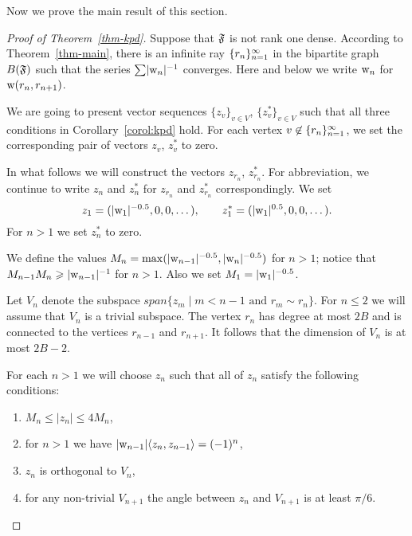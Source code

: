 \documentclass[12pt,oneside,a4paper]{amsart}
\begin{document}
      Now we prove the main result of this section.
      \begin{proof}[Proof of Theorem~\ref{thm-kpd}]
        Suppose that $\mathfrak{F}$ is not rank one dense.
        According to Theorem~\ref{thm-main}, there is an infinite ray $\{{r}_n\}_{n=1}^\infty$ in the bipartite
          graph $B(\mathfrak{F})$ such that the series $\sum\lvert\mathrm{w}_n\rvert^{-1}$ converges.
        Here and below we write $\mathrm{w}_n$ for $\mathrm{w}(r_n, r_{n + 1})$.

        We are going to present vector sequences $\{z_v\}_{v \in V}$, $\{z^*_v\}_{v \in V}$ such that all three conditions in Corollary~\ref{corol:kpd} hold.
        For each vertex $v \not \in \{{r}_n\}_{n=1}^\infty$,
          we set the corresponding pair of vectors $z_v$, $z^*_v$ to zero.

        In what follows we will construct the vectors $z_{r_n}$, $z_{r_n}^*$.
        For abbreviation, we continue to write $z_n$ and $z_n^*$ for $z_{r_n}$ and $z_{r_n}^*$ correspondingly.
        We set
        \[
          z_1=(\lvert\mathrm{w}_1\rvert^{-0.5}, 0, 0, \dots), \qquad z^*_1 = (\lvert\mathrm{w}_1\rvert^{0.5}, 0, 0, \dots).
        \]
        For $n > 1$ we set $z^*_n$ to zero.

        We define the values $M_n = \max(\lvert\mathrm{w}_{n-1}\rvert^{-0.5}, \lvert\mathrm{w}_n\rvert^{-0.5})$
          for $n > 1$; notice that $M_{n - 1} M_n \geqslant \lvert\mathrm{w}_{n - 1}\rvert^{-1}$ for $n > 1$.
        Also we set $M_1 = \lvert\mathrm{w}_1\rvert^{-0.5}$.

        Let $V_n$ denote the subspace $span\{z_m \mid m < n - 1 \text{ and } r_m \sim r_n\}$.
        For $n \leq 2$ we will assume that $V_n$ is a trivial subspace.
        The vertex $r_n$ has degree at most $2B$ and is connected to the vertices $r_{n-1}$ and $r_{n+1}$.
        It follows that the dimension of $V_n$ is at most $2B - 2$.

        For each $n > 1$ we will choose $z_n$ such that all of $z_n$ satisfy the following conditions:
        \begin{enumerate}[label=\textup{(\alph*)}]
          \item \label{kpd:c1} $M_n \leq \lvert z_n \rvert \leq 4 M_n$,
          \item \label{kpd:c2} for $n > 1$ we have $\lvert\mathrm{w}_{n-1}\rvert\langle z_n, z_{n - 1} \rangle = (-1)^{n}$,
          \item \label{kpd:c3} $z_n$ is orthogonal to $V_n$,
          \item \label{kpd:c4} for any non-trivial $V_{n + 1}$ the angle between $z_n$ and $V_{n + 1}$
              is at least $\pi/6$.
        \end{enumerate}


\end{proof}
\end{document}
